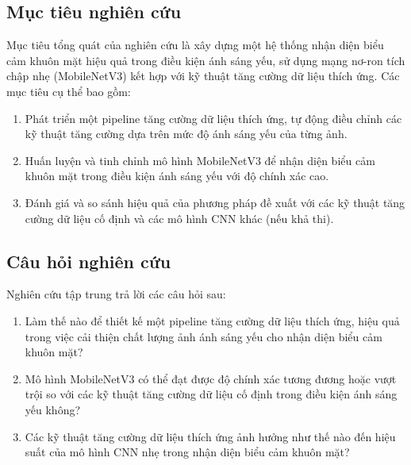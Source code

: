 \subsection{Mục tiêu nghiên cứu}
Mục tiêu tổng quát của nghiên cứu là xây dựng một hệ thống nhận diện biểu cảm khuôn mặt hiệu quả trong điều kiện ánh sáng yếu, sử dụng mạng nơ-ron tích chập nhẹ (MobileNetV3) kết hợp với kỹ thuật tăng cường dữ liệu thích ứng. Các mục tiêu cụ thể bao gồm:
\begin{enumerate}
    \item Phát triển một pipeline tăng cường dữ liệu thích ứng, tự động điều chỉnh các kỹ thuật tăng cường dựa trên mức độ ánh sáng yếu của từng ảnh.
    \item Huấn luyện và tinh chỉnh mô hình MobileNetV3 để nhận diện biểu cảm khuôn mặt trong điều kiện ánh sáng yếu với độ chính xác cao.
    \item Đánh giá và so sánh hiệu quả của phương pháp đề xuất với các kỹ thuật tăng cường dữ liệu cố định và các mô hình CNN khác (nếu khả thi).
\end{enumerate}

\subsection{Câu hỏi nghiên cứu}
Nghiên cứu tập trung trả lời các câu hỏi sau:
\begin{enumerate}
    \item Làm thế nào để thiết kế một pipeline tăng cường dữ liệu thích ứng, hiệu quả trong việc cải thiện chất lượng ảnh ánh sáng yếu cho nhận diện biểu cảm khuôn mặt?
    \item Mô hình MobileNetV3 có thể đạt được độ chính xác tương đương hoặc vượt trội so với các kỹ thuật tăng cường dữ liệu cố định trong điều kiện ánh sáng yếu không?
    \item Các kỹ thuật tăng cường dữ liệu thích ứng ảnh hưởng như thế nào đến hiệu suất của mô hình CNN nhẹ trong nhận diện biểu cảm khuôn mặt?
\end{enumerate}

